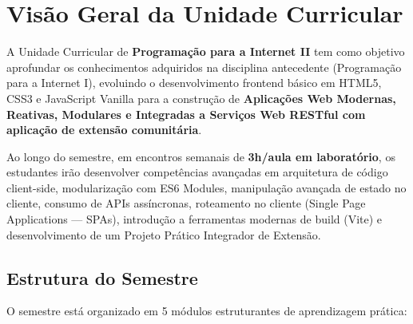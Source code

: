 \section{Visão Geral da Unidade Curricular}

A Unidade Curricular de \textbf{Programação para a Internet II} tem como objetivo aprofundar os conhecimentos adquiridos na disciplina antecedente (Programação para a Internet I), evoluindo o desenvolvimento frontend básico em HTML5, CSS3 e JavaScript Vanilla para a construção de \textbf{Aplicações Web Modernas, Reativas, Modulares e Integradas a Serviços Web RESTful com aplicação de extensão comunitária}.

Ao longo do semestre, em encontros semanais de \textbf{3h/aula em laboratório}, os estudantes irão desenvolver competências avançadas em arquitetura de código client-side, modularização com ES6 Modules, manipulação avançada de estado no cliente, consumo de APIs assíncronas, roteamento no cliente (Single Page Applications — SPAs), introdução a ferramentas modernas de build (Vite) e desenvolvimento de um Projeto Prático Integrador de Extensão.

\subsection*{Estrutura do Semestre}

O semestre está organizado em 5 módulos estruturantes de aprendizagem prática:

